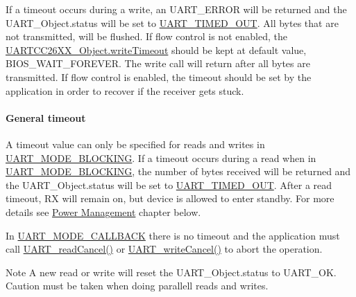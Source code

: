 If a timeout occurs during a write, an U\+A\+R\+T\+\_\+\+E\+R\+R\+O\+R will be returned and the U\+A\+R\+T\+\_\+\+Object.\+status will be set to \hyperlink{_u_a_r_t_c_c26_x_x_8h_a778bbef5f4b52a5651552136715f53c4aa965b1df388dcc5c87f1bb51120877c7}{U\+A\+R\+T\+\_\+\+T\+I\+M\+E\+D\+\_\+\+O\+U\+T}. All bytes that are not transmitted, will be flushed. If flow control is not enabled, the \hyperlink{struct_u_a_r_t_c_c26_x_x___object_a55b3ddd718d4de0aeffd2426c3f14efd}{U\+A\+R\+T\+C\+C26\+X\+X\+\_\+\+Object.\+write\+Timeout} should be kept at default value, B\+I\+O\+S\+\_\+\+W\+A\+I\+T\+\_\+\+F\+O\+R\+E\+V\+E\+R. The write call will return after all bytes are transmitted. If flow control is enabled, the timeout should be set by the application in order to recover if the receiver gets stuck.

\paragraph*{General timeout}

A timeout value can only be specified for reads and writes in \hyperlink{_u_a_r_t_8h_a2507a620dba95cd20885c52494d19e90ae6b6bd5d2d5df859ad6724e89e605ebf}{U\+A\+R\+T\+\_\+\+M\+O\+D\+E\+\_\+\+B\+L\+O\+C\+K\+I\+N\+G}. If a timeout occurs during a read when in \hyperlink{_u_a_r_t_8h_a2507a620dba95cd20885c52494d19e90ae6b6bd5d2d5df859ad6724e89e605ebf}{U\+A\+R\+T\+\_\+\+M\+O\+D\+E\+\_\+\+B\+L\+O\+C\+K\+I\+N\+G}, the number of bytes received will be returned and the U\+A\+R\+T\+\_\+\+Object.\+status will be set to \hyperlink{_u_a_r_t_c_c26_x_x_8h_a778bbef5f4b52a5651552136715f53c4aa965b1df388dcc5c87f1bb51120877c7}{U\+A\+R\+T\+\_\+\+T\+I\+M\+E\+D\+\_\+\+O\+U\+T}. After a read timeout, R\+X will remain on, but device is allowed to enter standby. For more details see \hyperlink{_u_a_r_t_c_c26_x_x_8h_POWER_MANAGEMENT}{Power Management} chapter below.

In \hyperlink{_u_a_r_t_8h_a2507a620dba95cd20885c52494d19e90ae0dbd9b5195e56c3c2aed10163523754}{U\+A\+R\+T\+\_\+\+M\+O\+D\+E\+\_\+\+C\+A\+L\+L\+B\+A\+C\+K} there is no timeout and the application must call \hyperlink{_u_a_r_t_8h_a51ed7e94d5b409ca1fcb2d65c5a25c3c}{U\+A\+R\+T\+\_\+read\+Cancel()} or \hyperlink{_u_a_r_t_8h_a0482cd0ab9ee7e802c8e785a5754d16d}{U\+A\+R\+T\+\_\+write\+Cancel()} to abort the operation.

\begin{DoxyNote}{Note}
A new read or write will reset the U\+A\+R\+T\+\_\+\+Object.\+status to U\+A\+R\+T\+\_\+\+O\+K. Caution must be taken when doing parallell reads and writes.
\end{DoxyNote}
